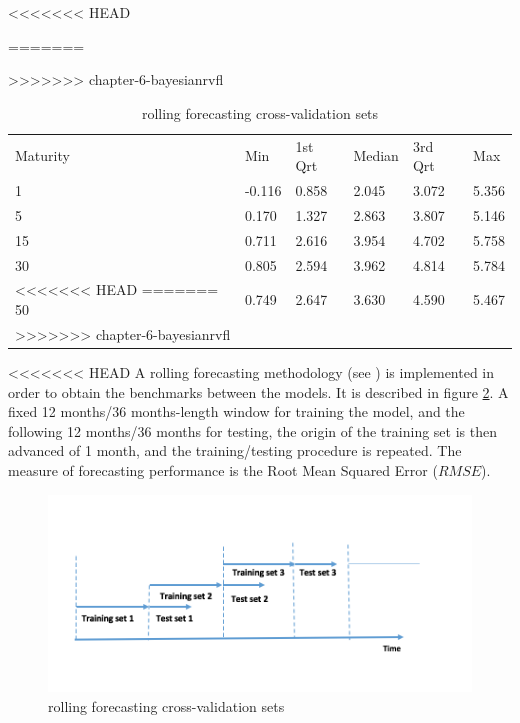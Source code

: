 <<<<<<< HEAD
\begin{table}[!htb]
=======
\begin{table}
>>>>>>> chapter-6-bayesianrvfl
\begin{center}
\caption{Summary of observed discount rates from Deutsche Bundesbank website, from 2002 to the end 2015}
\label{tab:summary_db_zeros}       %
\begin{tabular}{llllll}
\hline\noalign{\smallskip}
Maturity & Min & 1st Qrt  & Median  & 3rd Qrt  & Max  \\
\noalign{\smallskip}\hline\noalign{\smallskip}
  1 & -0.116 & 0.858 & 2.045 & 3.072 & 5.356 \\
  5 & 0.170 & 1.327 & 2.863 & 3.807 & 5.146\\
  15 & 0.711 & 2.616 & 3.954 & 4.702 & 5.758\\
  30 & 0.805 & 2.594 & 3.962 & 4.814 & 5.784\\
<<<<<<< HEAD
=======
  50 & 0.749 & 2.647 & 3.630 & 4.590 & 5.467\\
>>>>>>> chapter-6-bayesianrvfl
\noalign{\smallskip}\hline
\end{tabular}
\end{center}
\end{table}

<<<<<<< HEAD
A rolling forecasting methodology (see \cite{bergmeir2015note}) is implemented in order to obtain the benchmarks between the models. It is described in figure \ref{rolling_cv}. A fixed 12 months/36 months-length window for training the model, and the following 12 months/36 months for testing, the origin of the training set is then advanced of 1 month, and the training/testing procedure is repeated. The measure of forecasting performance is the Root Mean Squared Error ($RMSE$).

\begin{figure}[!htb]
\centering
\includegraphics[width=13.5cm]{gfx/chapter-krls-models/rolling_cv}
\caption{rolling forecasting cross-validation sets}
\label{rolling_cv}
\end{figure}



\end{table}
